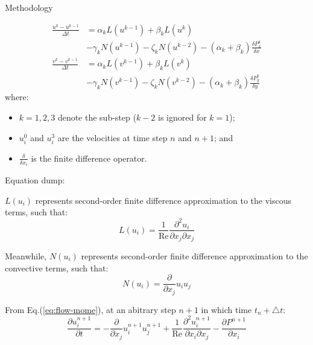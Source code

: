 \documentclass{beamer}
\newcommand{\timestep}{ \triangle t }
\begin{document}
\begin{frame}{Methodology}
	\framebreak 
	
	\begin{align*}
		\frac{u^k - u^{k-1}}{\Delta t} &= \alpha_k L \left( u^{k-1} \right) + \beta_k L \left( u^k \right) \\
		&- \gamma_k N \left( u^{k-1} \right) - \zeta_k N \left( u^{k-2} \right) - (\alpha_k + \beta_k) \frac{\delta P^k_x}{\delta x} \\
		\frac{v^k - v^{k-1}}{\Delta t} &= \alpha_k L \left( v^{k-1} \right) + \beta_k L \left( v^k \right) \\
		&- \gamma_k N \left( v^{k-1} \right) - \zeta_k N \left( v^{k-2} \right) - (\alpha_k + \beta_k) \frac{\delta P^k_y}{\delta y}
	\end{align*}
	where: \begin{itemize}
		\item $k = 1, 2, 3$ denote the sub-step ($k-2$ is ignored for $k=1$);
		\item $u^0_i$ and $u^3_i$ are the velocities at time step $n$ and $n+1$; and
		\item $\frac{\delta }{\delta x_i}$ is the finite difference operator.
	\end{itemize}
	
	\framebreak
	
	\begin{block}{}
		Equation dump:
	\end{block}
	
	$L(u_i)$ represents second-order finite difference approximation to the viscous terms, such that: \begin{equation}
		L (u_i) = \frac{1}{\text{Re}} \frac{\partial^2 u_i}{\partial x_j \partial x_j}
		\label{eq:viscous_terms}
	\end{equation}
	
	Meanwhile, $N(u_i)$ represents second-order finite difference approximation to the convective terms, such that: \begin{equation}
		N (u_i) = \frac{\partial }{\partial x_j} u_i u_j
		\label{eq:convective_terms}
	\end{equation}
	
	From Eq.(\ref{eq:flow-mome}), at an abitrary step $n+1$ in which time $t_n + \timestep$:
	\begin{equation}
		\frac{\partial u_i^{n+1}}{\partial t} = -\frac{\partial }{\partial x_j} u_i^{n+1} u_j^{n+1} + \frac{1}{\text{Re}} \frac{\partial^2 u_i^{n+1}}{\partial x_i \partial x_j} - \frac{\partial P^{n+1}}{\partial x_i} \label{eq:discritization}
	\end{equation}
	

\end{frame}
\end{document}
